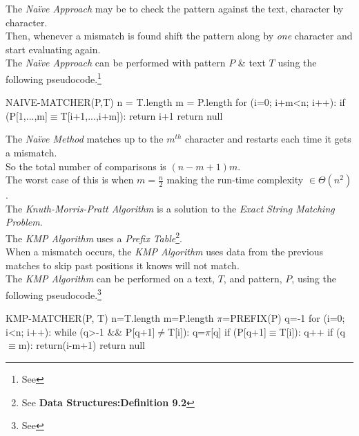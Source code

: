 \documentclass[11pt,a4paper]{article}
\begin{document}
The \textit{Na\"ive Approach} may be to check the pattern against the text, character by character.\\
Then, whenever a mismatch is found shift the pattern along by \textit{one} character and start evaluating again.\\
The \textit{Na\"ive Approach} can be performed with pattern $P$ \& text $T$ using the following pseudocode.\footnote{See {}}
\begin{code}
NAIVE-MATCHER(P,T)
n = T.length
m = P.length
for (i=0; i+m<n; i++):
  if (P[1,...,m]$\equiv$T[i+1,...,i+m]):
    return i+1
return null
\end{code}

The \textit{Na\"ive Method} matches up to the $m^{th}$ character and restarts each time it gets a mismatch.\\
So the total number of comparisons is $(n-m+1)m$.\\
The worst case of this is when $m=\frac{n}{2}$ making the run-time complexity $\in\Theta(n^2)$.\\

The \textit{Knuth-Morris-Pratt Algorithm} is a solution to the \textit{Exact String Matching Problem}.\\
The \textit{KMP Algorithm} uses a \textit{Prefix Table}\footnote{See \textbf{Data Structures:Definition 9.2}}.\\
When a mismatch occurs, the \textit{KMP Algorithm} uses data from the previous matches to skip past positions it knows will not match.\\
The \textit{KMP Algorithm} can be performed on a text, $T$, and pattern, $P$, using the following pseudocode.\footnote{See {}}
\begin{code}
KMP-MATCHER(P, T)
n=T.length
m=P.length
$\pi$=PREFIX(P)
q=-1
for (i=0; i<n; i++):
  while (q>-1 && P[q+1]$\neq$T[i]):
    q=$\pi$[q]
  if (P[q+1]$\equiv$T[i]):
    q++
  if (q$\equiv$m):
    return(i-m+1)
return null
\end{code}
\end{document}
